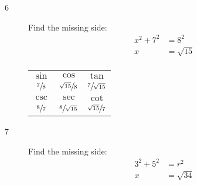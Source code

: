 \documentclass{exam}
\begin{document}
\begin{description}
\begin{tabular}[H]{ccc}
          \bottomrule
        \end{tabular}

      \item[6] 
        Find the missing side:
        \begin{align*}
          x^2 + 7^2 & = 8^2 \\
          x         & = \sqrt{15} \\
        \end{align*}

        \begin{tabular}[H]{ccc}
          \toprule

          $\sin$         & $\cos$                 & $\tan$                 \\
          $\sfrac{7}{8}$ & $\sfrac{\sqrt{15}}{8}$ & $\sfrac{7}{\sqrt{15}}$ \\

          \midrule

          $\csc$         & $\sec$                 & $\cot$ \\
          $\sfrac{8}{7}$ & $\sfrac{8}{\sqrt{15}}$ & $\sfrac{\sqrt{15}}{7}$ \\

          \bottomrule
        \end{tabular}

      \item[7]
        Find the missing side:
        \begin{align*}
          3^2 + 5^2 & = r^2 \\
          x         & = \sqrt{34} \\
        \end{align*}



\end{description}
\end{document}
